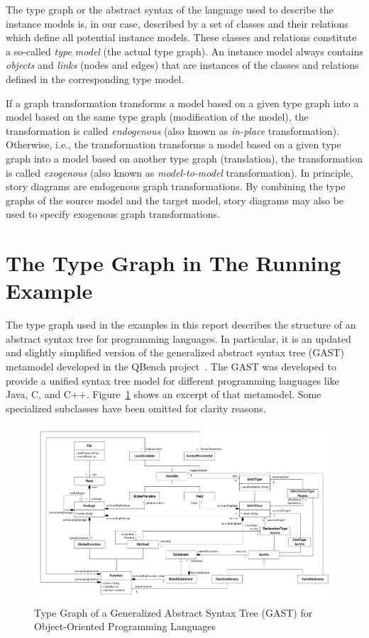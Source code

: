 The type graph or the abstract syntax of the language used to describe the instance models
is, in our case, described by a set of classes and their relations which define all potential instance models.
These classes and relations constitute a so-called \emph{type model} (the actual type graph).
An instance model always contains \emph{objects} and \emph{links} (nodes and edges) that are instances of the classes and relations defined in the corresponding type model.

If a graph transformation transforms a model based on a given type graph into a model based on the same type graph (modification of the model),
the transformation is called \emph{endogenous} (also known as \emph{in-place} transformation).
Otherwise, i.e., the transformation transforms a model based on a given type graph into a model based on another type graph (translation),
the transformation is called \emph{exogenous} (also known as \emph{model-to-model} transformation).
In principle, story diagrams are endogenous graph transformations.
By combining the type graphs of the source model and the target model, story diagrams may also be used to specify exogenous graph transformations.

\section{The Type Graph in The Running Example}
\label{sec:typeGraph}

The type graph used in the examples in this report describes the structure of an abstract syntax tree for programming languages.
In particular, it is an updated and slightly simplified version of the generalized abstract syntax tree (GAST) metamodel developed in the QBench project~\cite{QBench}.
The GAST was developed to provide a unified syntax tree model for different programming languages like Java, C, and C++.
Figure~\ref{fig:gast-mm} shows an excerpt of that metamodel.
Some specialized subclasses have been omitted for clarity reasons.

\begin{figure}[htbp]
  \centering
  \includegraphics[width=\linewidth]{figures/gast-mm}
  \caption{Type Graph of a Generalized Abstract Syntax Tree (GAST) for Object-Oriented Programming Languages \cite{QBench}}
  \label{fig:gast-mm}
\end{figure}

